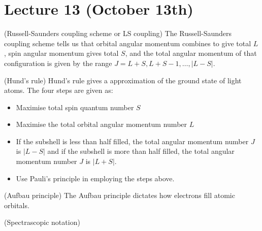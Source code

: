 \section{Lecture 13 (October 13th)}
\begin{thm}
(Russell-Saunders coupling scheme or LS coupling) The Russell-Saunders coupling scheme tells us that orbital angular momentum combines to give total $L$, spin angular momentum gives total $S$, and the total angular momentum of that configuration is given by the range $J=L+S,L+S-1,\ldots ,|L-S|$. 
\end{thm}
\vspace{2ex}
\begin{thm}
(Hund's rule) Hund's rule gives a approximation of the ground state of light atoms. The four steps are given as:
\begin{itemize}
\item[(i)] Maximise total spin quantum number $S$
\item[(i)] Maximise the total orbital angular momentum number $L$
\item[(iii)] If the subshell is less than half filled, the total angular momentum number $J$ is $|L-S|$ and if the subshell is more than half filled, the total angular momentum number $J$ is $|L+S|$. 
\item[(iv)] Use Pauli's principle in employing the steps above. 
\end{itemize}
\end{thm}
\vspace{2ex}
\begin{lem}
(Aufbau principle) The Aufbau principle dictates how electrons fill atomic orbitals.
\end{lem}
\vspace{2ex}
\begin{defi}
(Spectrascopic notation) 
\end{defi}
\vspace{2ex}

